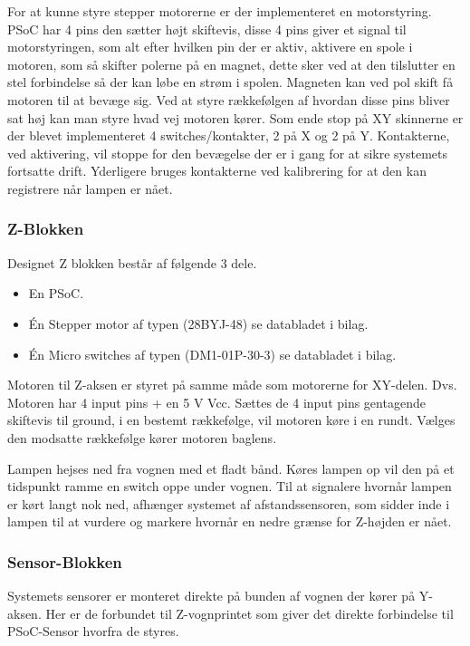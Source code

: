 For at kunne styre stepper motorerne er der implementeret en motorstyring. PSoC har 4 pins den sætter højt skiftevis, disse 4 pins giver et signal til motorstyringen, som alt efter hvilken pin der er aktiv, aktivere en spole i motoren, som så skifter polerne på en magnet, dette sker ved at den tilslutter en stel forbindelse så der kan løbe en strøm i spolen. Magneten kan ved pol skift få motoren til at bevæge sig. Ved at styre rækkefølgen af hvordan disse pins bliver sat høj kan man styre hvad vej motoren kører. Som ende stop på XY skinnerne er der blevet implementeret 4 switches/kontakter, 2 på X og 2 på Y. Kontakterne, ved aktivering, vil stoppe for den bevægelse der er i gang for at sikre systemets fortsatte drift. Yderligere bruges kontakterne ved kalibrering for at den kan registrere når lampen er nået.

\subsubsection{Z-Blokken}

Designet Z blokken består af følgende 3 dele.

\begin{itemize}
	\item En PSoC.
	\item Én Stepper motor af typen (28BYJ-48) se databladet i bilag.
	\item Én Micro switches af typen (DM1-01P-30-3) se databladet i bilag.
\end{itemize}

Motoren til Z-aksen er styret på samme måde som motorerne for XY-delen. Dvs. Motoren har 4 input pins + en 5 V Vcc. Sættes de 4 input pins gentagende skiftevis til ground, i en bestemt rækkefølge, vil motoren køre i en rundt. Vælges den modsatte rækkefølge kører motoren baglens.

Lampen hejses ned fra vognen med et fladt bånd. Køres lampen op vil den på et tidspunkt ramme en switch oppe under vognen. Til at signalere hvornår lampen er kørt langt nok ned, afhænger systemet af afstandssensoren, som sidder inde i lampen til at vurdere og markere hvornår en nedre grænse for Z-højden er nået.

\subsubsection{Sensor-Blokken}

Systemets sensorer er monteret direkte på bunden af vognen der kører på Y-aksen. Her er de forbundet til Z-vognprintet som giver det direkte forbindelse til PSoC-Sensor hvorfra de styres.

